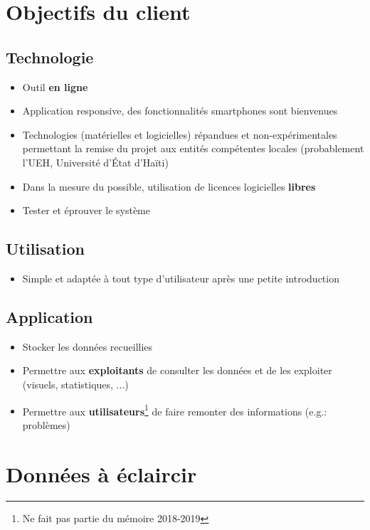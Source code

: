 \documentclass[a4paper, 11pt]{article}
\begin{document}
\section*{Objectifs du client}
    \subsection*{Technologie}
    \begin{itemize}
        \item Outil \textbf{en ligne}
        \item Application responsive, des fonctionnalités smartphones sont bienvenues 
        \item Technologies (matérielles et logicielles) répandues et non-expérimentales permettant la remise du projet aux entités compétentes locales (probablement l'UEH, Université d'État d'Haïti)
        \item Dans la mesure du possible, utilisation de licences logicielles \textbf{libres}
        \item Tester et éprouver le système
    \end{itemize}
    
    \subsection*{Utilisation}
    \begin{itemize}
       \item Simple et adaptée à tout type d'utilisateur après une petite introduction
    \end{itemize}
    
    \subsection*{Application}
    \begin{itemize}
        \item Stocker les données recueillies
        \item Permettre aux \textbf{exploitants} de consulter les données et de les exploiter (visuels, statistiques, ...)
        \item Permettre aux \textbf{utilisateurs}\footnote{Ne fait pas partie du mémoire 2018-2019} de faire remonter des informations (e.g.: problèmes)
    \end{itemize}
    
\section*{Données à éclaircir}
\end{document}
